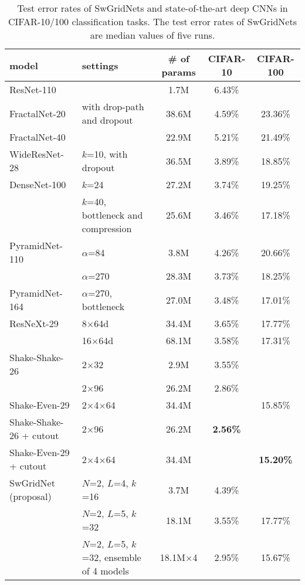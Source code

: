 \documentclass[10pt,twocolumn,letterpaper]{article}
\begin{document}
\begin{table*}
\centering
 \caption{Test error rates of SwGridNets and state-of-the-art deep CNNs in CIFAR-10/100 classification tasks.
 The test error rates of SwGridNets are median values of five runs.}
 \vskip 3pt
 \label{table:result2}
 \begin{tabular}{|l|l|c|c|c|}
  \hline
  model & settings & \# of params & CIFAR-10 & CIFAR-100 \\
  \hline
  ResNet-110~\cite{ResNet} & & 1.7M & 6.43\% & \\
  \hline
  FractalNet-20~\cite{FractalNet} & with drop-path and dropout & 38.6M & 4.59\% & 23.36\% \\
  FractalNet-40 & & 22.9M & 5.21\% & 21.49\% \\
  \hline
  WideResNet-28~\cite{WideResNet} & $k$=10, with dropout & 36.5M & 3.89\% & 18.85\% \\
  \hline
  DenseNet-100~\cite{DenseNet} & $k$=24 & 27.2M & 3.74\% & 19.25\% \\
  & $k$=40, bottleneck and compression & 25.6M & 3.46\% & 17.18\% \\
  \hline
  PyramidNet-110~\cite{PyramidalResNet} & $\alpha$=84 & 3.8M & 4.26\% & 20.66\% \\
  & $\alpha$=270 & 28.3M & 3.73\% & 18.25\% \\
  PyramidNet-164 & $\alpha$=270, bottleneck & 27.0M & 3.48\% & 17.01\% \\
  \hline
  ResNeXt-29~\cite{ResNeXt} & 8$\times$64d & 34.4M & 3.65\% & 17.77\% \\
  & 16$\times$64d & 68.1M & 3.58\% & 17.31\% \\
  \hline
  Shake-Shake-26~\cite{ShakeNet} & 2$\times$32 & 2.9M & 3.55\% & \\
  & 2$\times$96 & 26.2M & 2.86\% & \\
  Shake-Even-29 & 2$\times$4$\times$64 & 34.4M &  & 15.85\% \\
  \hline
  Shake-Shake-26 + cutout~\cite{Cutout} & 2$\times$96 & 26.2M & {\bf 2.56\%} & \\
  Shake-Even-29 + cutout & 2$\times$4$\times$64 & 34.4M & & {\bf 15.20\%} \\
  \hline
  SwGridNet (proposal) & $N$=2, $L$=4, $k$=16 & 3.7M & 4.39\% & \\
  & $N$=2, $L$=5, $k$=32 & 18.1M & 3.55\% & 17.77\% \\
  & $N$=2, $L$=5, $k$=32, ensemble of 4 models& 18.1M$\times$4 & 2.95\% & 15.67\% \\
  \hline
 \end{tabular} \\
\end{table*}
\end{document}
